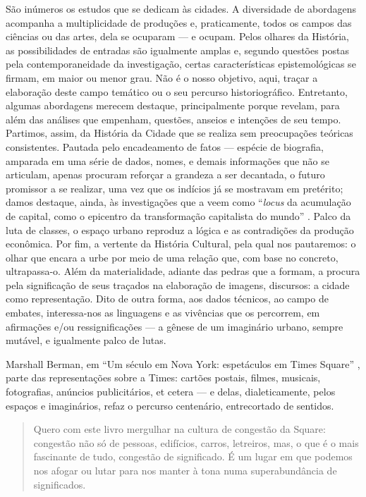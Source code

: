 \begin{refsection}
    São inúmeros os estudos que se dedicam às cidades. A diversidade de abordagens acompanha a multiplicidade de produções e, praticamente, todos os campos das ciências ou das artes, dela se ocuparam --- e ocupam. Pelos olhares da História, as possibilidades de entradas são igualmente amplas e, segundo questões postas pela contemporaneidade da investigação, certas características epistemológicas se firmam, em maior ou menor grau. Não é o nosso objetivo, aqui, traçar a elaboração deste campo temático ou o seu percurso historiográfico. Entretanto, algumas abordagens merecem destaque, principalmente porque revelam, para além das análises que empenham, questões, anseios e intenções de seu tempo. Partimos, assim, da História da Cidade que se realiza sem preocupações teóricas consistentes. Pautada pelo encadeamento de fatos --- espécie de biografia, amparada em uma série de dados, nomes, e demais informações que não se articulam, apenas procuram reforçar a grandeza a ser decantada, o futuro promissor a se realizar, uma vez que os indícios já se mostravam em pretérito; damos destaque, ainda, às investigações que a veem como ``\textit{locus} da acumulação de capital, como o epicentro da transformação capitalista do mundo'' \cite[p.~77]{Pesavento2014Historia}. Palco da luta de classes, o espaço urbano reproduz a lógica e as contradições da produção econômica. Por fim, a vertente da História Cultural, pela qual nos pautaremos:  o olhar que encara a urbe por meio de uma relação que, com base no concreto, ultrapassa-o. Além da materialidade, adiante das pedras que a formam, a procura pela significação de seus traçados na elaboração de imagens, discursos: a cidade como representação. Dito de outra forma, aos dados técnicos, ao campo de embates, interessa-nos as linguagens e as vivências que os percorrem, em afirmações e/ou ressignificações --- a gênese de um imaginário urbano, sempre mutável, e igualmente palco de lutas.  

    Marshall Berman, em ``Um século em Nova York: espetáculos em Times Square'' \citeyear{Berman2009Seculo}, parte das representações sobre a Times: cartões postais, filmes, musicais, fotografias, anúncios publicitários, et cetera --- e delas, dialeticamente, pelos espaços e imaginários, refaz o percurso centenário, entrecortado de sentidos.  

    \begin{quotation}
        Quero com este livro mergulhar na cultura de congestão da Square: congestão não só de pessoas, edifícios, carros, letreiros, mas, o que é o mais fascinante de tudo, congestão de significado. É um lugar em que podemos nos afogar ou lutar para nos manter à tona numa superabundância de significados. \cite[p.~16]{Berman2009Seculo} 
    \end{quotation}


\end{refsection}
